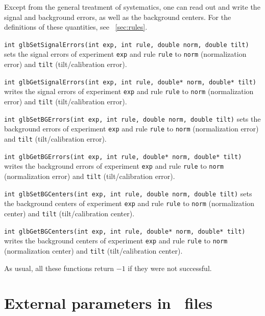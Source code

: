 Except from the general treatment of systematics, one can read out
and write the signal and background errors, as well as the background
centers. For the definitions of these quantities, see \Sec~\ref{sec:rules}.
\begin{function}
{\tt int glbSetSignalErrors(int exp, int rule, double norm, double tilt)}
sets the signal errors of experiment {\tt exp} and rule {\tt rule}
to {\tt norm} (normalization error) and {\tt tilt} (tilt/calibration error).
\end{function}
\begin{function}
{\tt int glbGetSignalErrors(int exp, int rule, double* norm, double* tilt)}
writes the signal errors of experiment {\tt exp} and rule {\tt rule}
to {\tt norm} (normalization error) and {\tt tilt} (tilt/calibration error).
\end{function}
\begin{function}
{\tt int glbSetBGErrors(int exp, int rule, double norm, double tilt)}
sets the background errors of experiment {\tt exp} and rule {\tt rule}
to {\tt norm} (normalization error) and {\tt tilt} (tilt/calibration error).
\end{function}
\begin{function}
{\tt int glbGetBGErrors(int exp, int rule, double* norm, double* tilt)}
writes the background errors of experiment {\tt exp} and rule {\tt rule}
to {\tt norm} (normalization error) and {\tt tilt} (tilt/calibration error).
\end{function}
\begin{function}
{\tt int glbSetBGCenters(int exp, int rule, double norm, double tilt)}
sets the background centers of experiment {\tt exp} and rule {\tt rule}
to {\tt norm} (normalization center) and {\tt tilt} (tilt/calibration center).
\end{function}
\begin{function}
{\tt int glbGetBGCenters(int exp, int rule, double* norm, double* tilt)}
writes the background centers of experiment {\tt exp} and rule {\tt rule}
to {\tt norm} (normalization center) and {\tt tilt} (tilt/calibration center).
\end{function}
As usual, all these functions return $-1$ if they were not successful.

\section{External parameters in \AEDL\ files}
\label{sec:aedlparams}

